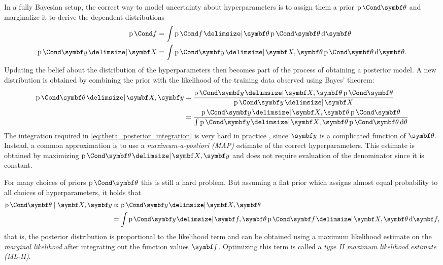 In a fully Bayesian setup, the correct way to model uncertainty about hyperparameters is to assign them a prior $\Prob{\mat{\theta}}$ and marginalize it to derive the dependent distributions
\begin{align}
    \Prob{f} &= \int \Prob{f \given \mat{\theta}} \Prob{\mat{\theta}} \diff \mat{\theta} \\
    \Prob{\mat{y} \given \mat{X}} &= \int \Prob{\mat{y} \given \mat{X}, \mat{\theta}} \Prob{\mat{\theta}} \diff \mat{\theta}. \label{eq:theta_posterior_integration}
\end{align}
Updating the belief about the distribution of the hyperparameters then becomes part of the process of obtaining a posterior model.
A new distribution is obtained by combining the prior with the likelihood of the training data observed using Bayes' theorem:
\begin{align}
    \begin{split}
        \Prob{\mat{\theta} \given \mat{X}, \mat{y}} &= \frac{\Prob{\mat{y} \given \mat{X}, \mat{\theta}} \Prob{\mat{\theta}}}{\Prob{\mat{y} \given \mat{X}}} \\
        &= \frac{\Prob{\mat{y} \given \mat{X}, \mat{\theta}} \Prob{\mat{\theta}}}{\int \Prob{\mat{y} \given \mat{X}, \mat{\theta}} \Prob{\mat{\theta}} \diff \theta}
    \end{split}
\end{align}
The integration required in \cref{eq:theta_posterior_integration} is very hard in practice \cite{rasmussen_gaussian_2006}, since $\mat{y}$ is a complicated function of $\mat{\theta}$.
Instead, a common approximation is to use a \emph{maximum-a-postiori (MAP)} estimate of the correct hyperparameters.
This estimate is obtained by maximizing $\Prob{\mat{\theta} \given \mat{X}, \mat{y}}$ and does not require evaluation of the denominator since it is constant.

For many choices of priors $\Prob{\mat{\theta}}$ this is still a hard problem.
But assuming a flat prior which assigns almost equal probability to all choices of hyperparameters, it holds that
\begin{align}
    \begin{split}
        \Prob{\mat{\theta} \mid \mat{X}, \mat{y}} &\propto \Prob{\mat{y} \given \mat{X}, \mat{\theta}} \\
        &= \int \Prob{\mat{y} \given \mat{f}, \mat{\theta}} \Prob{\mat{f} \given \mat{X}, \mat{\theta}} \diff \mat{f},
    \end{split}
\end{align}
that is, the posterior distribution is proportional to the likelihood term and can be obtained using a maximum likelihood estimate on the \emph{marginal likelihood} after integrating out the function values $\mat{f}$.
Optimizing this term is called a \emph{type II maximum likelihood estimate (ML-II)}.

